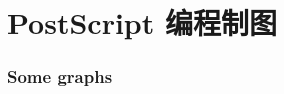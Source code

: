 \documentclass[zihao=-4,linespread=1.5,heading=true,a4paper,twoside]{ctexart}
\begin{document}
\newpage
\part{PostScript 编程制图}
\section{Some graphs}


%

%

%

%


%

%

%
\end{document}
